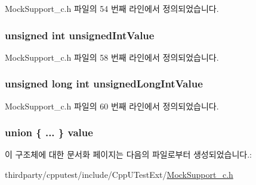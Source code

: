 Mock\+Support\+\_\+c.\+h 파일의 54 번째 라인에서 정의되었습니다.

\subsubsection[{\texorpdfstring{unsigned\+Int\+Value}{unsignedIntValue}}]{\setlength{\rightskip}{0pt plus 5cm}unsigned int unsigned\+Int\+Value}\hypertarget{struct_s_mock_value__c_a425a71424f07e5dd3c427e80e0b65d0d}{}\label{struct_s_mock_value__c_a425a71424f07e5dd3c427e80e0b65d0d}


Mock\+Support\+\_\+c.\+h 파일의 58 번째 라인에서 정의되었습니다.

\subsubsection[{\texorpdfstring{unsigned\+Long\+Int\+Value}{unsignedLongIntValue}}]{\setlength{\rightskip}{0pt plus 5cm}unsigned long int unsigned\+Long\+Int\+Value}\hypertarget{struct_s_mock_value__c_acedede3a0350c500d29fa777023a2272}{}\label{struct_s_mock_value__c_acedede3a0350c500d29fa777023a2272}


Mock\+Support\+\_\+c.\+h 파일의 60 번째 라인에서 정의되었습니다.

\subsubsection[{\texorpdfstring{value}{value}}]{\setlength{\rightskip}{0pt plus 5cm}union \{ ... \}   value}\hypertarget{struct_s_mock_value__c_a22bb9352683f0925da341951892bcfda}{}\label{struct_s_mock_value__c_a22bb9352683f0925da341951892bcfda}


이 구조체에 대한 문서화 페이지는 다음의 파일로부터 생성되었습니다.\+:\begin{DoxyCompactItemize}
\item 
thirdparty/cpputest/include/\+Cpp\+U\+Test\+Ext/\hyperlink{_mock_support__c_8h}{Mock\+Support\+\_\+c.\+h}\end{DoxyCompactItemize}
